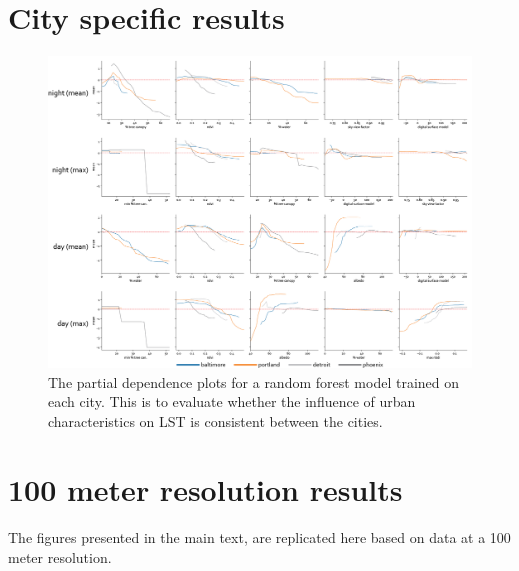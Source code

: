 \documentclass[final,3p,times,twocolumn,sort&compress]{elsarticle}
\begin{document}
\section{City specific results}
\begin{figure}[h]
    \centering
    \includegraphics[width=\linewidth]{fig/report/pdp_cities_500.png}
    \caption[City specific partial dependence plots]{
    The partial dependence plots for a random forest model trained on each city.
    This is to evaluate whether the influence of urban characteristics on LST is consistent between the cities.
    }
    \label{fig:cities_500}
\end{figure}


\newpage
\section{100 meter resolution results}
\label{sec:100_meter}
The figures presented in the main text, are replicated here based on data at a 100 meter resolution.
\end{document}
